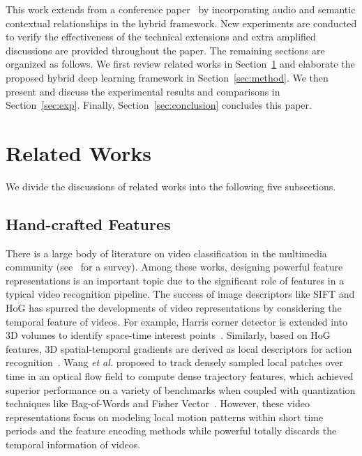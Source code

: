\documentclass[journal]{IEEEtran}
\makeatletter
\newcommand*{\etal}{\emph{et al.}\@\xspace}
\makeatother
\begin{document}
This work extends from a conference paper~\cite{Wu2015} by incorporating audio and semantic contextual relationships in the hybrid framework. New experiments are conducted to verify the effectiveness of the technical extensions and extra amplified discussions are provided throughout the paper. The remaining sections are organized as follows. We first review related works in Section~\ref{sec:related} and elaborate the proposed hybrid deep learning framework in Section~\ref{sec:method}. We then present and discuss the experimental results and comparisons in Section~\ref{sec:exp}. Finally, Section~\ref{sec:conclusion} concludes this paper.

\section{Related Works}
\label{sec:related}
We divide the discussions of related works into the following five subsections. 
\subsection{Hand-crafted Features}
There is a large body of literature on video classification in the multimedia community (see~\cite{IJMIR:EventSurvey} for a survey). Among these works, designing powerful feature representations is an important topic due to the significant role of features in a typical video recognition pipeline. The success of image descriptors like SIFT and HoG has spurred the developments of video representations by considering the temporal feature of videos. For example, Harris corner detector is extended into 3D volumes to identify space-time interest points~\cite{laptevSTIP}. Similarly, based on HoG features, 3D spatial-temporal gradients are derived as local descriptors for action recognition~\cite{klaser2008spatio}. Wang \etal proposed to track densely sampled local patches over time in an optical flow field to compute dense trajectory features, which achieved superior performance on a variety of benchmarks when coupled with quantization techniques like Bag-of-Words and Fisher Vector~\cite{oneata2013action,han2017vrfp}. However, these video representations focus on modeling local motion patterns within short time periods and the feature encoding methods while powerful totally discards the temporal information of videos. 
\end{document}
